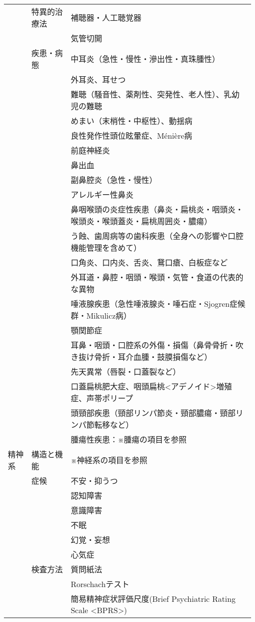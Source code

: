 \begin{xltabular}{\linewidth}{XXX}
 & 特異的治療法 & 補聴器・人工聴覚器 \\
 &  & 気管切開 \\
 & 疾患・病態 & 中耳炎（急性・慢性・滲出性・真珠腫性） \\
 &  & 外耳炎、耳せつ \\
 &  & 難聴（騒音性、薬剤性、突発性、老人性）、乳幼児の難聴 \\
 &  & めまい（末梢性・中枢性）、動揺病 \\
 &  & 良性発作性頭位眩暈症、Ménière病 \\
 &  & 前庭神経炎 \\
 &  & 鼻出血 \\
 &  & 副鼻腔炎（急性・慢性） \\
 &  & アレルギー性鼻炎 \\
 &  & 鼻咽喉頭の炎症性疾患（鼻炎・扁桃炎・咽頭炎・喉頭炎・喉頭蓋炎・扁桃周囲炎・膿瘍） \\
 &  & う蝕、歯周病等の歯科疾患（全身への影響や口腔機能管理を含めて） \\
 &  & 口角炎、口内炎、舌炎、鵞口瘡、白板症など \\
 &  & 外耳道・鼻腔・咽頭・喉頭・気管・食道の代表的な異物 \\
 &  & 唾液腺疾患（急性唾液腺炎・唾石症・Sjogren症候群・Mikulicz病） \\
 &  & 顎関節症 \\
 &  & 耳鼻・咽頭・口腔系の外傷・損傷（鼻骨骨折・吹き抜け骨折・耳介血腫・鼓膜損傷など） \\
 &  & 先天異常（唇裂・口蓋裂など） \\
 &  & 口蓋扁桃肥大症、咽頭扁桃<アデノイド>増殖症、声帯ポリープ \\
 &  & 頭頸部疾患（頸部リンパ節炎・頸部膿瘍・頸部リンパ節転移など） \\
 &  & 腫瘍性疾患：※腫瘍の項目を参照 \\
精神系 & 構造と機能 & ※神経系の項目を参照 \\
 & 症候 & 不安・抑うつ \\
 &  & 認知障害 \\
 &  & 意識障害 \\
 &  & 不眠 \\
 &  & 幻覚・妄想 \\
 &  & 心気症 \\
 & 検査方法 & 質問紙法 \\
 &  & Rorschachテスト \\
 &  & 簡易精神症状評価尺度(Brief Psychiatric Rating Scale <BPRS>) \\

\end{xltabular}
